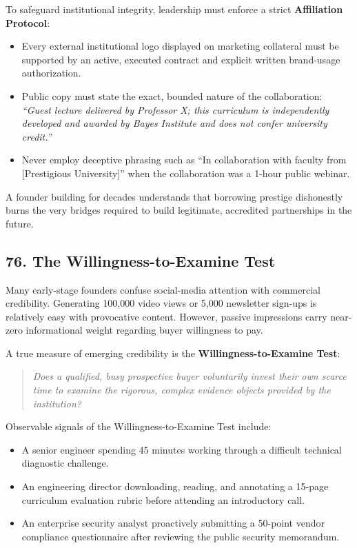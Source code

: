 To safeguard institutional integrity, leadership must enforce a strict \textbf{Affiliation Protocol}:
\begin{itemize}
\item Every external institutional logo displayed on marketing collateral must be supported by an active, executed contract and explicit written brand-usage authorization.
\item Public copy must state the exact, bounded nature of the collaboration: \emph{``Guest lecture delivered by Professor X; this curriculum is independently developed and awarded by Bayes Institute and does not confer university credit.''}
\item Never employ deceptive phrasing such as ``In collaboration with faculty from [Prestigious University]'' when the collaboration was a 1-hour public webinar.
\end{itemize}

A founder building for decades understands that borrowing prestige dishonestly burns the very bridges required to build legitimate, accredited partnerships in the future.

\subsection*{76. The Willingness-to-Examine Test}

Many early-stage founders confuse social-media attention with commercial credibility. Generating 100,000 video views or 5,000 newsletter sign-ups is relatively easy with provocative content. However, passive impressions carry near-zero informational weight regarding buyer willingness to pay.

A true measure of emerging credibility is the \textbf{Willingness-to-Examine Test}:
\begin{quote}
\textit{Does a qualified, busy prospective buyer voluntarily invest their own scarce time to examine the rigorous, complex evidence objects provided by the institution?}
\end{quote}

Observable signals of the Willingness-to-Examine Test include:
\begin{itemize}
\item A senior engineer spending 45 minutes working through a difficult technical diagnostic challenge.
\item An engineering director downloading, reading, and annotating a 15-page curriculum evaluation rubric before attending an introductory call.
\item An enterprise security analyst proactively submitting a 50-point vendor compliance questionnaire after reviewing the public security memorandum.
\end{itemize}


